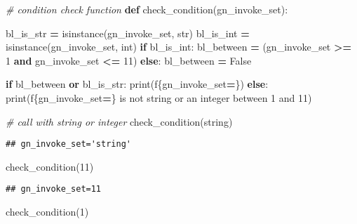 \documentclass[
]{book}
\newenvironment{Shaded}{\begin{snugshade}}{\end{snugshade}}
\newcommand{\BuiltInTok}[1]{#1}
\newcommand{\CommentTok}[1]{\textcolor[rgb]{0.56,0.35,0.01}{\textit{#1}}}
\newcommand{\ControlFlowTok}[1]{\textcolor[rgb]{0.13,0.29,0.53}{\textbf{#1}}}
\newcommand{\DecValTok}[1]{\textcolor[rgb]{0.00,0.00,0.81}{#1}}
\newcommand{\KeywordTok}[1]{\textcolor[rgb]{0.13,0.29,0.53}{\textbf{#1}}}
\newcommand{\NormalTok}[1]{#1}
\newcommand{\OperatorTok}[1]{\textcolor[rgb]{0.81,0.36,0.00}{\textbf{#1}}}
\newcommand{\SpecialCharTok}[1]{\textcolor[rgb]{0.00,0.00,0.00}{#1}}
\newcommand{\SpecialStringTok}[1]{\textcolor[rgb]{0.31,0.60,0.02}{#1}}
\newcommand{\StringTok}[1]{\textcolor[rgb]{0.31,0.60,0.02}{#1}}
\newcommand{\VariableTok}[1]{\textcolor[rgb]{0.00,0.00,0.00}{#1}}
\begin{document}
\begin{Shaded}
\begin{Highlighting}[]
\CommentTok{\# condition check function}
\KeywordTok{def}\NormalTok{ check\_condition(gn\_invoke\_set):}

\NormalTok{  bl\_is\_str }\OperatorTok{=} \BuiltInTok{isinstance}\NormalTok{(gn\_invoke\_set, }\BuiltInTok{str}\NormalTok{)}
\NormalTok{  bl\_is\_int }\OperatorTok{=} \BuiltInTok{isinstance}\NormalTok{(gn\_invoke\_set, }\BuiltInTok{int}\NormalTok{)}
  \ControlFlowTok{if}\NormalTok{ bl\_is\_int:}
\NormalTok{    bl\_between }\OperatorTok{=}\NormalTok{ (gn\_invoke\_set }\OperatorTok{\textgreater{}=} \DecValTok{1} \KeywordTok{and}\NormalTok{ gn\_invoke\_set }\OperatorTok{\textless{}=} \DecValTok{11}\NormalTok{)}
  \ControlFlowTok{else}\NormalTok{: }
\NormalTok{    bl\_between }\OperatorTok{=} \VariableTok{False}
    
  \ControlFlowTok{if}\NormalTok{ bl\_between }\KeywordTok{or}\NormalTok{ bl\_is\_str:}
      \BuiltInTok{print}\NormalTok{(}\SpecialStringTok{f\textquotesingle{}}\SpecialCharTok{\{}\NormalTok{gn\_invoke\_set}\OperatorTok{=}\SpecialCharTok{\}}\SpecialStringTok{\textquotesingle{}}\NormalTok{)}
  \ControlFlowTok{else}\NormalTok{:}
      \BuiltInTok{print}\NormalTok{(}\SpecialStringTok{f\textquotesingle{}}\SpecialCharTok{\{}\NormalTok{gn\_invoke\_set}\OperatorTok{=}\SpecialCharTok{\}}\SpecialStringTok{ is not string or an integer between 1 and 11\textquotesingle{}}\NormalTok{)}
      
\CommentTok{\# call with string or integer}
\NormalTok{check\_condition(}\StringTok{\textquotesingle{}string\textquotesingle{}}\NormalTok{)}
\end{Highlighting}
\end{Shaded}

\begin{verbatim}
## gn_invoke_set='string'
\end{verbatim}

\begin{Shaded}
\begin{Highlighting}[]
\NormalTok{check\_condition(}\DecValTok{11}\NormalTok{)}
\end{Highlighting}
\end{Shaded}

\begin{verbatim}
## gn_invoke_set=11
\end{verbatim}

\begin{Shaded}
\begin{Highlighting}[]
\NormalTok{check\_condition(}\DecValTok{1}\NormalTok{)}
\end{Highlighting}
\end{Shaded}
\end{document}
